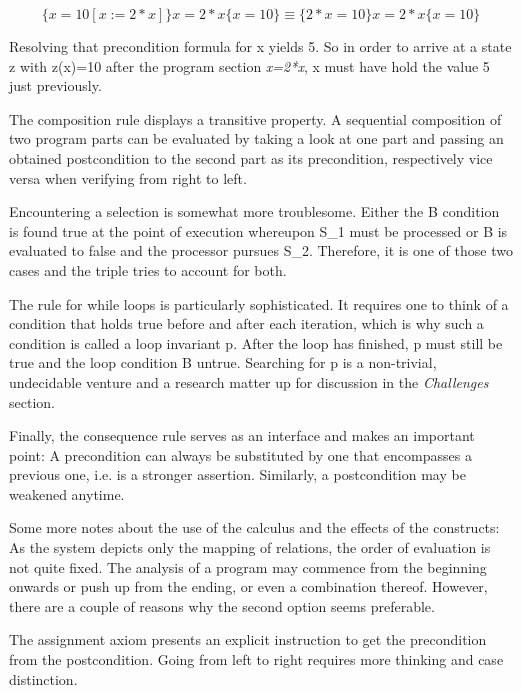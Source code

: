 \newenvironment{hoare}[0]{\begin{equation}}{\end{equation}}

\begin{hoare}
	\{x=10[x:=2*x]\} x=2*x \{x=10\} \equiv \{2*x=10\} x=2*x \{x=10\}
\end{hoare}

Resolving that precondition formula for x yields 5. So in order to arrive at a state z with z(x)=10 after the program section \textit{x=2*x}, x must have hold the value 5 just previously.

The composition rule displays a transitive property. A sequential composition of two program parts can be evaluated by taking a look at one part and passing an obtained postcondition to the second part as its precondition, respectively vice versa when verifying from right to left.

Encountering a selection is somewhat more troublesome. Either the B condition is found true at the point of execution whereupon S\_1 must be processed or B is evaluated to false and the processor pursues S\_2. Therefore, it is one of those two cases and the triple tries to account for both.

The rule for while loops is particularly sophisticated. It requires one to think of a condition that holds true before and after each iteration, which is why such a condition is called a loop invariant p. After the loop has finished, p must still be true and the loop condition B untrue. Searching for p is a non-trivial, undecidable venture and a research matter up for discussion in the \textit{Challenges} section.

Finally, the consequence rule serves as an interface and makes an important point: A precondition can always be substituted by one that encompasses a previous one, i.e. is a stronger assertion. Similarly, a postcondition may be weakened anytime.

Some more notes about the use of the calculus and the effects of the constructs:
As the system depicts only the mapping of relations, the order of evaluation is not quite fixed. The analysis of a program may commence from the beginning onwards or push up from the ending, or even a combination thereof. However, there are a couple of reasons why the second option seems preferable.

The assignment axiom presents an explicit instruction to get the precondition from the postcondition. Going from left to right requires more thinking and case distinction.

